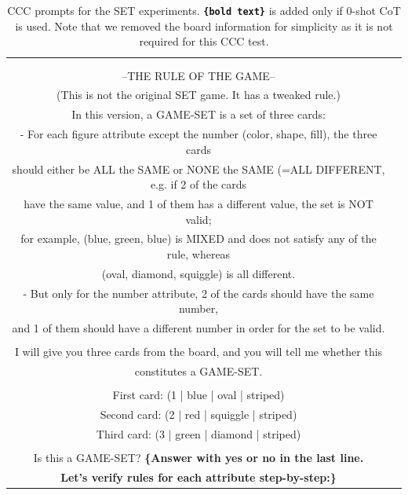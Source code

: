 \begin{table}[t!]
\begin{tabular}{cl}
{{Set of fills are: solid , striped , open . \\ \\--THE RULE OF THE GAME-- \\(This is not the original SET game. It has a tweaked rule.)\\
In this version, a GAME-SET is a set of three cards:\\
- For each figure attribute except the number (color, shape, fill), the three cards \\ should either be ALL the SAME or NONE the SAME (=ALL DIFFERENT, e.g. if 2 of the cards \\ have the same value, and 1 of them has a different value, the set is NOT valid; \\ for example, (blue, green, blue) is MIXED and does not satisfy any of the rule, whereas \\ (oval, diamond, squiggle) is all different.
\\- But only for the number attribute, 2 of the cards should have the same number, \\ and 1 of them should have a different number in order for the set to be valid.\\\\I will give you three cards from the board, and you will tell me whether this\\constitutes a GAME-SET. \\\\
First card: (1 | blue | oval | striped) \\
Second card: (2 | red | squiggle | striped) \\
Third card: (3 | green | diamond | striped) \\\\
Is this a GAME-SET? \textbf{\{Answer with yes or no in the last line.}\\\textbf{Let's verify rules for each attribute step-by-step:\}}}} \\ 
    \bottomrule
    \end{tabular}
    \caption{\label{tab:prompts-set-control}
    CCC prompts for the SET experiments. \texttt{\textbf{\{bold text\}}} is added only if 0-shot CoT is used. Note that we removed the board information for simplicity as it is not required for this CCC test.
    }
\end{table}
